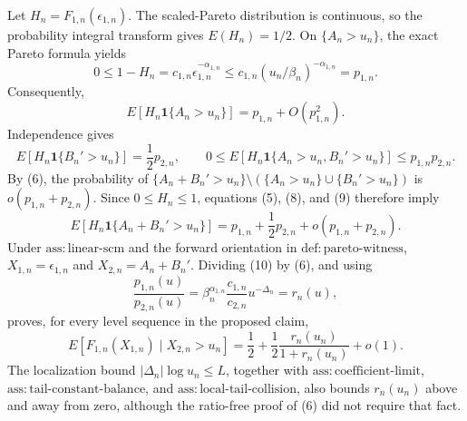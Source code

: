 Let \(H_n=F_{1,n}(\epsilon_{1,n})\).  The scaled-Pareto distribution is continuous, so the probability integral transform gives \(E(H_n)=1/2\).  On \(\{A_n>u_n\}\), the exact Pareto formula yields
\[
0\leq1-H_n=c_{1,n}\epsilon_{1,n}^{-\alpha_{1,n}}
\leq c_{1,n}(u_n/\beta_n)^{-\alpha_{1,n}}=p_{1,n}.
\tag{7}
\]
Consequently,
\[
E\!\left[H_n\mathbf1\{A_n>u_n\}\right]
=p_{1,n}+O(p_{1,n}^2).
\tag{8}
\]
Independence gives
\[
E\!\left[H_n\mathbf1\{B_n'>u_n\}\right]=\frac12p_{2,n},
\qquad
0\leq E\!\left[H_n\mathbf1\{A_n>u_n,B_n'>u_n\}\right]
\leq p_{1,n}p_{2,n}.
\tag{9}
\]
By (6), the probability of
\(\{A_n+B_n'>u_n\}\setminus(\{A_n>u_n\}\cup\{B_n'>u_n\})\)
is \(o(p_{1,n}+p_{2,n})\).  Since \(0\leq H_n\leq1\), equations (5), (8), and (9) therefore imply
\[
E\!\left[H_n\mathbf1\{A_n+B_n'>u_n\}\right]
=p_{1,n}+\frac12p_{2,n}+o(p_{1,n}+p_{2,n}).
\tag{10}
\]
Under \(\mathrm{ass{:}linear\text{-}scm}\) and the forward orientation in \(\mathrm{def{:}pareto\text{-}witness}\), \(X_{1,n}=\epsilon_{1,n}\) and \(X_{2,n}=A_n+B_n'\).  Dividing (10) by (6), and using
\[
\frac{p_{1,n}(u)}{p_{2,n}(u)}
=\beta_n^{\alpha_{1,n}}\frac{c_{1,n}}{c_{2,n}}u^{-\Delta_n}
=r_n(u),
\tag{11}
\]
proves, for every level sequence in the proposed claim,
\[
E[F_{1,n}(X_{1,n})\mid X_{2,n}>u_n]
=\frac12+\frac12\frac{r_n(u_n)}{1+r_n(u_n)}+o(1).
\tag{12}
\]
The localization bound \(|\Delta_n|\log u_n\leq L\), together with \(\mathrm{ass{:}coefficient\text{-}limit}\), \(\mathrm{ass{:}tail\text{-}constant\text{-}balance}\), and \(\mathrm{ass{:}local\text{-}tail\text{-}collision}\), also bounds \(r_n(u_n)\) above and away from zero, although the ratio-free proof of (6) did not require that fact.

